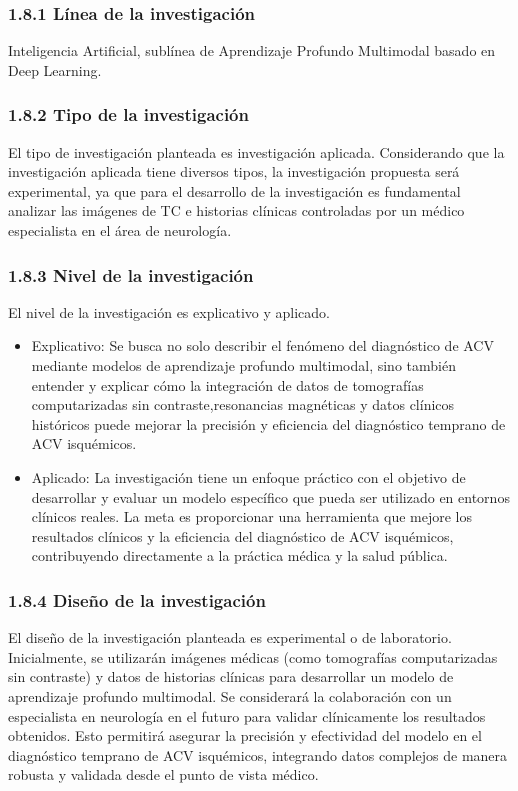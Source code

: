 \subsubsection{1.8.1 Línea de la investigación}
Inteligencia Artificial, sublínea de Aprendizaje Profundo Multimodal basado en Deep Learning.
\subsubsection{1.8.2 Tipo de la investigación}
El tipo de investigación planteada es investigación aplicada. Considerando que la investigación aplicada tiene diversos tipos, la investigación propuesta será experimental, ya que para el desarrollo de la investigación es fundamental analizar las imágenes de TC e historias clínicas controladas por un médico especialista en el área de neurología.
\subsubsection{1.8.3 Nivel de la investigación}
El nivel de la investigación es explicativo y aplicado.
\begin{itemize}
    \item Explicativo: Se busca no solo describir el fenómeno del diagnóstico de ACV mediante modelos de aprendizaje profundo multimodal, sino también entender y explicar cómo la integración de datos de tomografías computarizadas sin contraste,resonancias magnéticas y datos clínicos históricos puede mejorar la precisión y eficiencia del diagnóstico temprano de ACV isquémicos.
    \item Aplicado: La investigación tiene un enfoque práctico con el objetivo de desarrollar y evaluar un modelo específico que pueda ser utilizado en entornos clínicos reales. La meta es proporcionar una herramienta que mejore los resultados clínicos y la eficiencia del diagnóstico de ACV isquémicos, contribuyendo directamente a la práctica médica y la salud pública.
\end{itemize}

\subsubsection{1.8.4 Diseño de la investigación}
El diseño de la investigación planteada es experimental o de laboratorio. Inicialmente, se utilizarán imágenes médicas (como tomografías computarizadas sin contraste) y datos de historias clínicas para desarrollar un modelo de aprendizaje profundo multimodal. Se considerará la colaboración con un especialista en neurología en el futuro para validar clínicamente los resultados obtenidos. Esto permitirá asegurar la precisión y efectividad del modelo en el diagnóstico temprano de ACV isquémicos, integrando datos complejos de manera robusta y validada desde el punto de vista médico.


